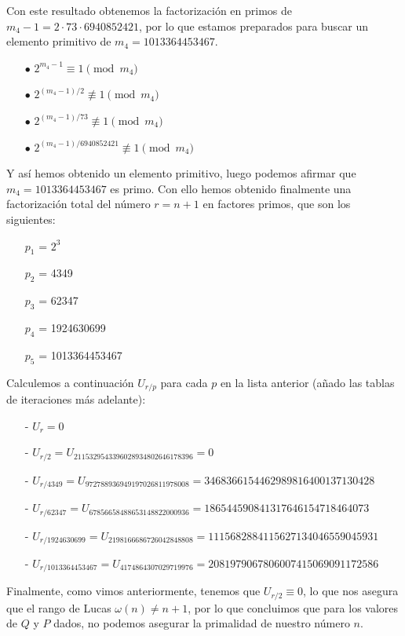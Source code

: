 \documentclass[fleqn]{article}
\begin{document}
    Con este resultado obtenemos la factorización en primos de $m_{4} - 1 = 2 \cdot 73 \cdot 6940852421$, por lo que estamos preparados para buscar un elemento primitivo de $m_{4} = 1013364453467$.
    \begin{enumerate}
        \item[$\bullet$] $2^{m_{4} -1} \equiv 1 \pmod{m_{4}}$
        \item[$\bullet$] $2^{(m_{4} -1)/2} \not\equiv 1 \pmod{m_{4}}$
        \item[$\bullet$] $2^{(m_{4} -1)/73} \not\equiv 1 \pmod{m_{4}}$
        \item[$\bullet$] $2^{(m_{4} -1)/6940852421} \not\equiv 1 \pmod{m_{4}}$
    \end{enumerate}
    Y así hemos obtenido un elemento primitivo, luego podemos afirmar que $m_{4} = 1013364453467$ es primo.
    Con ello hemos obtenido finalmente una factorización total del número $r = n+1$ en factores primos, que son los siguientes:
    \begin{enumerate}
        \item[$p_1$ =] $2^3$
        \item[$p_2$ =] 4349
        \item[$p_3$ =] 62347
        \item[$p_4$ =] 1924630699 
        \item[$p_5$ =] 1013364453467 
    \end{enumerate}
    Calculemos a continuación $U_{r/p}$ para cada $p$ en la lista anterior (añado las tablas de iteraciones más adelante):
    \begin{enumerate}
        \item[-] $U_{r} = 0$  
        \item[-] $U_{r/2} = U_ {2115329543396028934802646178396} = 0$ %
        \item[-] $U_{r/4349} = U_ {972788936949197026811978008} = 3468366154462989816400137130428$
        \item[-] $U_{r/62347} = U_ {67856658488653148822000936} = 186544590841317646154718464073$
        \item[-] $U_{r/1924630699} = U_ {2198166686726042848808} = 1115682884115627134046559045931$
        \item[-] $U_{r/1013364453467} = U_ {4174864307029719976} = 2081979067806007415069091172586$
    \end{enumerate}

    Finalmente, como vimos anteriormente, tenemos que $U_{r/2} \equiv 0$, lo que nos asegura que el rango de Lucas $\omega(n) \neq n+1$, por lo
    que concluimos que para los valores de $Q$ y $P$ dados, no podemos asegurar la primalidad de nuestro número $n$.
\end{document}
